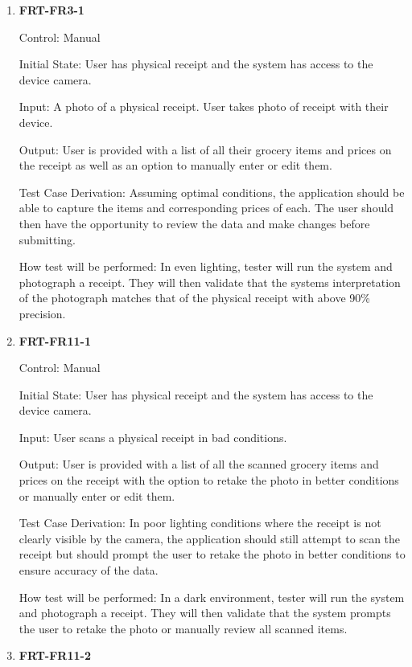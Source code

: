 \documentclass[12pt, titlepage]{article}
\begin{document}
\begin{enumerate}

\item{\textbf{FRT-FR3-1}}

Control: Manual
          
Initial State: User has physical receipt and the system has access to the device camera.
          
Input: A photo of a physical receipt. User takes photo of receipt with their device.
          
Output: User is provided with a list of all their grocery items and prices on the receipt as well as an option to manually enter or edit them.

Test Case Derivation: Assuming optimal conditions, the application should be able to capture the items and corresponding prices
of each. The user should then have the opportunity to review the data and make changes before submitting.
          
How test will be performed: In even lighting, tester will run the system and photograph a receipt. They will then validate that the systems interpretation of the photograph matches that of the physical receipt with above 90\% precision.

\item{\textbf{FRT-FR11-1}}

Control: Manual
          
Initial State: User has physical receipt and the system has access to the device camera.

Input: User scans a physical receipt in bad conditions.
          
Output: User is provided with a list of all the scanned grocery items and prices on the receipt with the option to retake the photo in better conditions or manually enter or edit them.

Test Case Derivation: In poor lighting conditions where the receipt is not clearly visible by the camera, the application should still
attempt to scan the receipt but should prompt the user to retake the photo in better conditions to ensure accuracy of the data.
          
How test will be performed: In a dark environment, tester will run the system and photograph a receipt. They will then validate that the system prompts the user to retake the photo or manually review all scanned items.

\item{\textbf{FRT-FR11-2}}


\end{enumerate}
\end{document}
